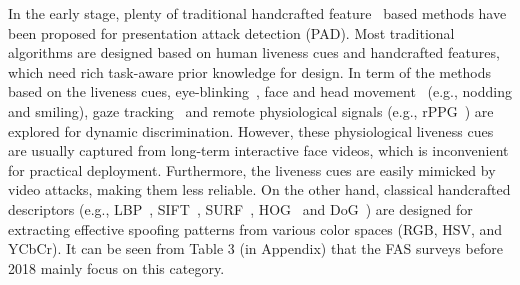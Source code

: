 \documentclass[10pt,journal,compsoc]{IEEEtran}
\begin{document}
In the early stage, plenty of traditional handcrafted feature~\cite{pan2007eye,li2016generalized,Pereira2012LBP,Komulainen2014Context,Patel2016Secure} based methods have been proposed for presentation attack detection (PAD). Most traditional algorithms are designed based on human liveness cues and handcrafted features, which need rich task-aware prior knowledge for design. In term of the methods based on the liveness cues, eye-blinking~\cite{pan2007eye,jee2006liveness,li2008eye}, face and head movement~\cite{wang2009face,bao2009liveness} (e.g., nodding and smiling), gaze tracking~\cite{bigun2004assuring,ali2012liveness} and remote physiological signals (e.g., rPPG~\cite{li2016generalized,Liu2018Learning,lin2019face,yu2019remote1}) are explored for dynamic discrimination. However, these physiological liveness cues are usually captured from long-term interactive face videos, which is inconvenient for practical deployment. Furthermore, the liveness cues are easily mimicked by video attacks, making them less reliable. On the other hand, classical handcrafted descriptors (e.g., LBP~\cite{boulkenafet2015face,Pereira2012LBP}, 
SIFT~\cite{Patel2016Secure}, SURF~\cite{boulkenafet2016face2}, HOG~\cite{Komulainen2014Context} and DoG~\cite{tan2010face}) are designed for extracting effective spoofing patterns from various color spaces (RGB, HSV, and YCbCr). It can be seen from Table 3 (in Appendix) that the FAS surveys before 2018 mainly focus on this category. 




\newcommand{\tabincell}[2]{\begin{tabular}{@{}#1@{}}#2\end{tabular}}
\end{document}
